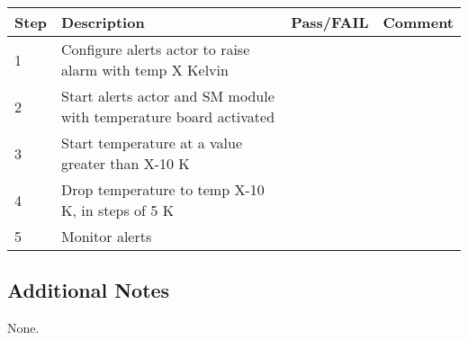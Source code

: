 \begin{table}[H]
    \begin{tabular}{|l| p{5cm} |l| p{5cm} |}
    \hline
    {\bf Step} & {\bf Description} & {\bf Pass/FAIL} & {\bf Comment}  \\ \hline
    1 & Configure alerts actor to raise alarm with temp X Kelvin &  &  \\ \hline
    2 & Start alerts actor and SM module with temperature board activated &  & \\ \hline
    3 & Start temperature at a value greater than X-10 K &  & \\ \hline
    4 & Drop temperature to temp X-10 K, in steps of 5 K &  & \\ \hline
    5 & Monitor alerts &  & \\ \hline
    \end{tabular}
\end{table}

\subsection{Additional Notes}

None.
